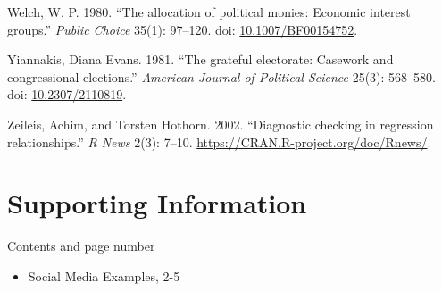 \documentclass[12pt,]{article}
\newlength{\cslhangindent}
\newenvironment{CSLReferences}[2]%
    {\setlength{\parindent}{0pt}%
    \everypar{\setlength{\hangindent}{\cslhangindent}}\ignorespaces}%
    {\par}
\providecommand{\tightlist}{%
\setlength{\itemsep}{0pt}\setlength{\parskip}{0pt}}
\begin{document}
\begin{CSLReferences}{1}{0}
\leavevmode{}%
Welch, W. P. 1980. {``The allocation of political monies: Economic
interest groups.''} \emph{Public Choice} 35(1): 97--120. doi:
\href{https://doi.org/10.1007/BF00154752}{10.1007/BF00154752}.

\leavevmode{}%
Yiannakis, Diana Evans. 1981. {``The grateful electorate: Casework and
congressional elections.''} \emph{American Journal of Political Science}
25(3): 568--580. doi:
\href{https://doi.org/10.2307/2110819}{10.2307/2110819}.

\leavevmode{}%
Zeileis, Achim, and Torsten Hothorn. 2002. {``Diagnostic checking in
regression relationships.''} \emph{R News} 2(3): 7--10.
\url{https://CRAN.R-project.org/doc/Rnews/}.

\end{CSLReferences}

\newpage

\setcounter{page}{1}

\hypertarget{supporting-information}{%
\section{Supporting Information}\label{supporting-information}}

Contents and page number

\begin{itemize}
\tightlist
\item
  Social Media Examples, 2-5
\end{itemize}

\newpage
\end{document}
